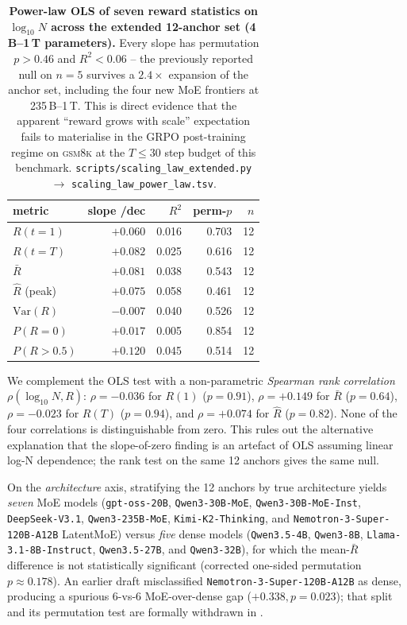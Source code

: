 \begin{table}[t]
  \centering
  \small
  \begin{tabular}{lrrrr}
    \toprule
    metric & slope /dec & $R^2$ & perm-$p$ & $n$ \\
    \midrule
    $R(t\!=\!1)$           & $+0.060$ & 0.016 & 0.703 & 12 \\
    $R(t\!=\!T)$           & $+0.082$ & 0.025 & 0.616 & 12 \\
    $\bar R$                & $+0.081$ & 0.038 & 0.543 & 12 \\
    $\hat R$ (peak)         & $+0.075$ & 0.058 & 0.461 & 12 \\
    $\text{Var}(R)$         & $-0.007$ & 0.040 & 0.526 & 12 \\
    $P(R{=}0)$              & $+0.017$ & 0.005 & 0.854 & 12 \\
    $P(R{>}0.5)$            & $+0.120$ & 0.045 & 0.514 & 12 \\
    \bottomrule
  \end{tabular}
  \caption{\textbf{Power-law OLS of seven reward statistics on
    $\log_{10} N$ across the extended 12-anchor set
    (4\,B--1\,T parameters).}  Every slope has
    permutation $p > 0.46$ and $R^2 < 0.06$ -- the previously
    reported null on $n = 5$ survives a $2.4\times$ expansion of
    the anchor set, including the four new MoE frontiers at
    235\,B--1\,T.  This is direct evidence that the apparent
    ``reward grows with scale'' expectation fails to materialise in
    the GRPO post-training regime on \textsc{gsm8k} at the
    $T \le 30$ step budget of this benchmark.  \texttt{scripts/scaling\_law\_extended.py}
    $\to$ \texttt{scaling\_law\_power\_law.tsv}.}
  \label{tab:scaling-powerlaw}
\end{table}

We complement the OLS test with a non-parametric
\emph{Spearman rank correlation} $\rho(\log_{10}N, R)$:
$\rho = -0.036$ for $R(1)$ ($p = 0.91$), $\rho = +0.149$ for
$\bar R$ ($p = 0.64$), $\rho = -0.023$ for $R(T)$ ($p = 0.94$),
and $\rho = +0.074$ for $\hat R$ ($p = 0.82$).  None of the four
correlations is distinguishable from zero.  This rules out the
alternative explanation that the slope-of-zero finding is an
artefact of OLS assuming linear log-N dependence; the rank test
on the same 12 anchors gives the same null.

On the \emph{architecture} axis, stratifying the 12 anchors by true
architecture yields \emph{seven} MoE models (\texttt{gpt-oss-20B},
\texttt{Qwen3-30B-MoE}, \texttt{Qwen3-30B-MoE-Inst},
\texttt{DeepSeek-V3.1}, \texttt{Qwen3-235B-MoE},
\texttt{Kimi-K2-Thinking}, and \texttt{Nemotron-3-Super-120B-A12B}
LatentMoE) versus \emph{five} dense models (\texttt{Qwen3.5-4B},
\texttt{Qwen3-8B}, \texttt{Llama-3.1-8B-Instruct},
\texttt{Qwen3.5-27B}, and \texttt{Qwen3-32B}), for which the
mean-$\bar R$ difference is not statistically significant
(corrected one-sided permutation $p \approx 0.178$).  An earlier
draft misclassified \texttt{Nemotron-3-Super-120B-A12B} as dense,
producing a spurious 6-vs-6 MoE-over-dense gap ($+0.338, p = 0.023$);
that split and its permutation test are formally withdrawn in
.

